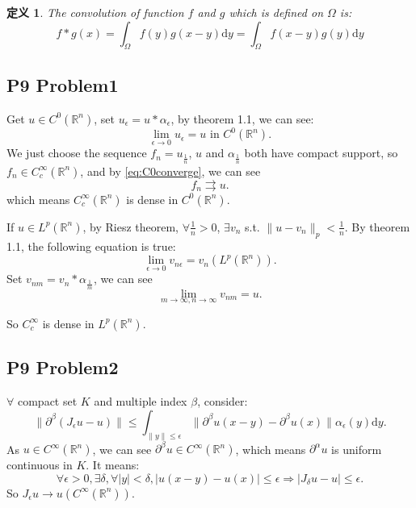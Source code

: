 \documentclass[a4paper]{ctexart}
\newtheorem{Definition}{\hspace{2em}定义}
\newcommand{\dif}{\mathrm{d}}
\begin{document}
\begin{Definition}
    The convolution of function $f$ and $g$ which is defined on $\Omega$ is:
    \begin{equation}
        f*g(x)=\int_{\Omega}f(y)g(x-y)\dif y=\int_{\Omega}f(x-y)g(y)\dif y
    \end{equation}
\end{Definition}
\subsection*{P9 Problem1}
Get $u\in C^{0}(\mathbb{R}^{n})$, set $u_{\epsilon}=u*\alpha_{\epsilon}$, by theorem 1.1, we can see:
\begin{equation}
    \label{eq:C0converge}
    \lim_{\epsilon\rightarrow 0}u_{\epsilon}=u\text{ in }C^{0}(\mathbb{R}^{n}).
\end{equation}
We just choose the sequence $f_{n}=u_{\frac{1}{n}}$, $u$ and $\alpha_{\frac{1}{n}}$ both have compact support, so $f_{n}\in C_{c}^{\infty}(\mathbb{R}^{n})$, and by \eqref{eq:C0converge}, we can see 
\begin{equation}
    f_{n}\rightrightarrows u.
\end{equation}
which means $C_{c}^{\infty}(\mathbb{R}^{n})$ is dense in $C^{0}(\mathbb{R}^{n})$.

If $u\in L^{p}(\mathbb{R}^{n})$, by Riesz theorem, $\forall \frac{1}{n}>0$, $\exists v_{n}$ s.t. $\|u-v_{n}\|_{p}<\frac{1}{n}$. By theorem 1.1, the following equation is true:
\begin{equation}
    \label{eq:Lpconverge}
    \lim_{\epsilon\rightarrow 0}v_{n\epsilon}=v_{n}(L^{p}(\mathbb{R}^{n})).
\end{equation}
Set $v_{nm}=v_{n}*\alpha_{\frac{1}{m}}$, we can see
\begin{equation}
    \lim_{m\rightarrow\infty,n\rightarrow\infty}v_{nm}=u.
\end{equation}

So $C_{c}^{\infty}$ is dense in $L^{p}(\mathbb{R}^{n})$.
\subsection*{P9 Problem2}
$\forall$ compact set $K$ and multiple index $\beta$, consider:
\begin{equation}
    \|\partial^{\beta}(J_{\epsilon}u-u)\|\leqslant\int_{\|y\|\leqslant\epsilon}\|\partial^{\beta}u(x-y)-\partial^{\beta}u(x)\|\alpha_{\epsilon}(y)\dif y.
\end{equation}
As $u\in C^{\infty}(\mathbb{R}^{n})$, we can see $\partial^{\beta}u\in C^{\infty}(\mathbb{R}^{n})$, which means $\partial^{\alpha}u$ is uniform continuous in $K$. It means:
\begin{equation}
    \forall\epsilon>0,\exists\delta,\forall|y|<\delta,|u(x-y)-u(x)|\leqslant\epsilon\Rightarrow|J_{\delta}u-u|\leqslant\epsilon.
\end{equation}
So $J_{\epsilon}u\rightarrow u(C^{\infty}(\mathbb{R}^{n})).$
\end{document}
